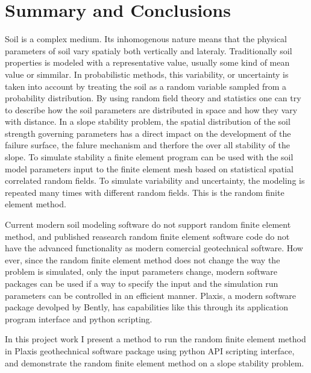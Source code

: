 \section*{Summary and Conclusions}
Soil is a complex medium. 
Its inhomogenous nature means that the physical parameters of soil vary spatialy both vertically and lateraly. 
Traditionally soil properties is modeled with a representative value, usually some kind of mean value or simmilar. 
In probabilistic methods, this variability, or uncertainty is taken into account by treating the soil as a random variable sampled from a probability distribution. 
By using random field theory and statistics one can try to describe how the soil parameters are distributed in space and how they vary with distance.
In a slope stability problem, the spatial distribution of the soil strength governing parameters has a direct impact on the development of the failure surface, the falure mechanism and therfore the over all stability of the slope.
To simulate stability a finite element program can be used with the soil model parameters input to the finite element mesh based on statistical spatial correlated random fields.
To simulate variability and uncertainty, the modeling is repeated many times with different random fields.
This is the random finite element method.


Current modern soil modeling software do not support random finite element method, and published reasearch random finite element software code do not have the advanced functionality as modern comercial geotechnical software. 
How ever, since the random finite element method does not change the way the problem is simulated, only the input parameters change, modern software packages can be used if a way to specify the input and the simulation run parameters can be controlled in an efficient manner.
Plaxis, a modern software package devolped by Bently, has capabilities like this through its application program interface and python scripting. 

In this project work I present a method to run the random finite element method in Plaxis geothechnical software package using python API scripting interface, and demonstrate the random finite element method on a slope stability problem.
